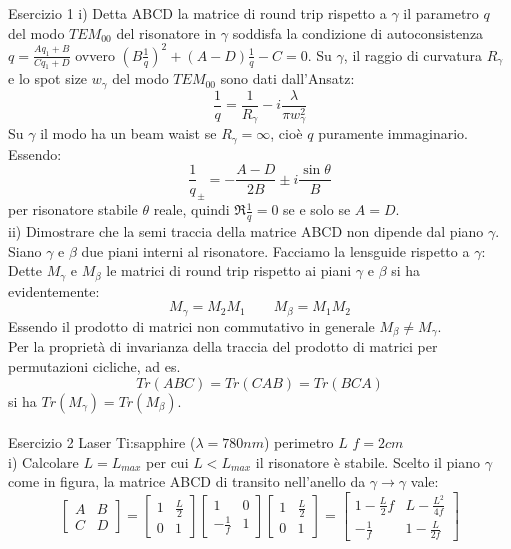 \documentclass{book}
\def \l {\lambda}
\theoremstyle{remark}
\begin{document}
Esercizio 1
i) Detta ABCD la matrice di round trip rispetto a $\gamma$ il parametro $q$ del modo $TEM_{00}$ del risonatore in $\gamma$ soddisfa la condizione di autoconsistenza $q = \frac{Aq_1 + B}{Cq_1 + D}$ ovvero $\left(B\frac{1}{q}\right)^2 + (A-D)\frac{1}{q} - C = 0$. Su $\gamma$, il raggio di curvatura $R_\gamma$ e lo spot size $w_\gamma$ del modo $TEM_{00}$ sono dati dall'Ansatz:
\begin{equation*}
\frac{1}{q} = \frac{1}{R_\gamma} -i\frac{\l}{\pi w_\gamma^2}
\end{equation*}
Su $\gamma$ il modo ha un beam waist se $R_\gamma=\infty$, cioè $q$ puramente immaginario. Essendo:
\begin{equation*}
\frac{1}{q}_\pm = -\frac{A-D}{2B} \pm i\frac{\sin\theta}{B}
\end{equation*}
per risonatore stabile $\theta$ reale, quindi $\Re{\frac{1}{q}}=0$ se e solo se $A=D$.\\
ii) Dimostrare che la semi traccia della matrice ABCD non dipende dal piano $\gamma$.\\
Siano $\gamma$ e $\beta$ due piani interni al risonatore. Facciamo la lensguide rispetto a $\gamma$:
Dette $M_\gamma$ e $M_\beta$ le matrici di round trip rispetto ai piani $\gamma$ e $\beta$ si ha evidentemente:
\begin{equation*}
M_\gamma = M_2M_1 \qquad M_\beta = M_1M_2
\end{equation*}
Essendo il prodotto di matrici non commutativo in generale $M_\beta \neq M_\gamma$.\\
Per la proprietà di invarianza della traccia del prodotto di matrici per permutazioni cicliche, ad es.
\begin{equation*}
Tr(ABC) = Tr(CAB) = Tr(BCA)
\end{equation*}
si ha $Tr(M_\gamma) = Tr(M_\beta)$.\\
\\
Esercizio 2
Laser Ti:sapphire ($\l=780nm$)
perimetro $L$
$f = 2cm$\\
i) Calcolare $L=L_{max}$ per cui $L<L_{max}$ il risonatore è stabile.
Scelto il piano $\gamma$ come in figura, la matrice ABCD di transito nell'anello da $\gamma\rightarrow\gamma$ vale:
\begin{equation*}
\begin{bmatrix}
A	&	B\\
C	&	D
\end{bmatrix}
=\begin{bmatrix}
1	&	\frac{L}{2}\\
0	&	1
\end{bmatrix}\begin{bmatrix}
1	&	0\\
-\frac{1}{f}	&	1
\end{bmatrix}\begin{bmatrix}
1	&	\frac{L}{2}\\
0	&	1
\end{bmatrix}=\begin{bmatrix}
1-\frac{L}2f{}	&	L-\frac{L^2}{4f}\\
-\frac{1}{f}	&	1-\frac{L}{2f}
\end{bmatrix}
\end{equation*}
\end{document}
